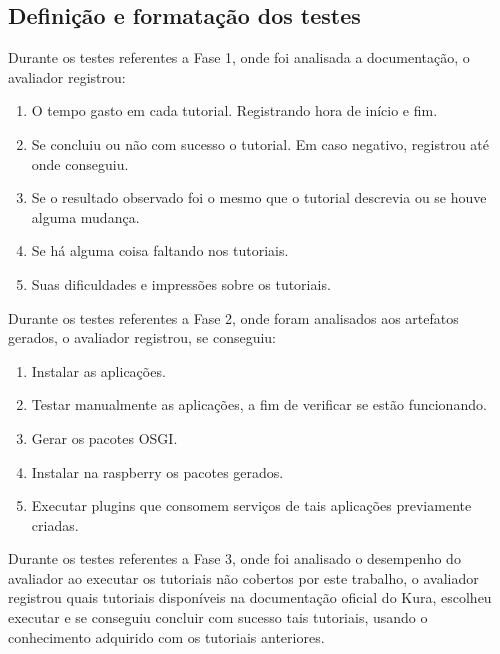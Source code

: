 \subsection{Definição e formatação dos testes}

Durante os testes referentes a Fase 1, onde foi analisada a documentação, o avaliador registrou:

\begin{enumerate}
  \item O tempo gasto em cada tutorial. Registrando hora de início e fim.
  \item Se concluiu ou não com sucesso o tutorial. Em caso negativo, registrou até onde conseguiu.
  \item Se o resultado observado foi o mesmo que o tutorial descrevia ou se houve alguma mudança.
  \item Se há alguma coisa faltando nos tutoriais.
  \item Suas dificuldades e impressões sobre os tutoriais.
\end{enumerate}

Durante os testes referentes a Fase 2, onde foram analisados aos artefatos gerados, o avaliador registrou, se conseguiu:

\begin{enumerate}
  \item Instalar as aplicações.
  \item Testar manualmente as aplicações, a fim de verificar se estão funcionando.
  \item Gerar os pacotes OSGI.
  \item Instalar na raspberry os pacotes gerados.
  \item Executar plugins que consomem serviços de tais aplicações previamente criadas.
\end{enumerate}

Durante os testes referentes a Fase 3, onde foi analisado o desempenho do avaliador ao executar os tutoriais não cobertos por este trabalho, o avaliador registrou quais tutoriais disponíveis na documentação oficial do Kura, escolheu executar e se conseguiu concluir com sucesso tais tutoriais, usando o conhecimento adquirido com os tutoriais anteriores.





